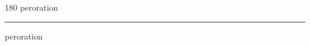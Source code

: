 
\begin{frame}
\begin{center}
\begin{turn}{180}
{\fontsize{2.5cm}{1em}\selectfont peroration}
\end{turn}
\vspace{1em}\par  
\hrule
\vspace{1em}\par  
{\fontsize{2.5cm}{1em}\selectfont peroration}
\end{center}
\end{frame}
